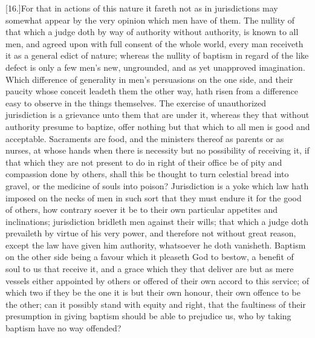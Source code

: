[16.]For that in actions of this nature it fareth not as in jurisdictions may somewhat appear by the very opinion which men have of them. The nullity of that which a judge doth by way of authority without authority, is known to all men, and agreed upon with full consent of the whole world, every man receiveth it as a general edict of nature; whereas the nullity of baptism in regard of the like defect is only a few men’s new, ungrounded, and as yet unapproved imagination. Which difference of generality in men’s persuasions on the one side, and their paucity whose conceit leadeth them the other way, hath risen from a difference easy to observe in the things themselves. The exercise of unauthorized jurisdiction is a grievance unto them that are under it, whereas they that without authority presume to baptize, offer nothing but that which to all men is good and acceptable. Sacraments are food, and the ministers thereof as parents or as nurses, at whose hands when there is necessity but no possibility of receiving it, if that which they are not present to do in right of their office be of pity and compassion done by others, shall this be thought to turn celestial bread into gravel, or the medicine of souls into poison? Jurisdiction is a yoke which law hath imposed on the necks of men in such sort that they must endure it for the good of others, how contrary soever it be to their own particular appetites and inclinations; jurisdiction bridleth men against their wills; that which a judge doth prevaileth by virtue of his very power, and therefore not without great reason, except the law have given him authority,  whatsoever he doth vanisheth.
 Baptism on the other side being a favour which it pleaseth God to bestow, a benefit of soul to us that receive it, and a grace which they that deliver are but as mere vessels either appointed by others or offered of their own accord to this service; of which two if they be the one it is but their own honour, their own offence to be the other; can it possibly stand with equity and right, that the faultiness of their presumption in giving baptism should be able to prejudice us, who by taking baptism have no way offended?

